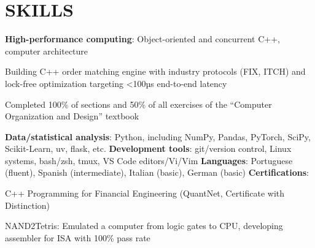 \section{SKILLS}
\textbf{High-performance computing}: Object-oriented and concurrent C++, computer architecture
\begin{onecolentry}
    \begin{highlights}
        \item Building C++ order matching engine with industry protocols (FIX, ITCH) and lock-free optimization targeting <100µs end-to-end latency
        \item Completed 100\% of sections and 50\% of all exercises of the “Computer Organization and Design” textbook 
    \end{highlights}
\end{onecolentry}
\textbf{Data/statistical analysis}: Python, including NumPy, Pandas, PyTorch, SciPy, Scikit-Learn, uv, flask, etc. \newline
\textbf{Development tools}: git/version control, Linux systems, bash/zsh, tmux, VS Code editors/Vi/Vim \newline
\textbf{Languages}: Portuguese (fluent), Spanish (intermediate), Italian (basic), German (basic) \newline
\textbf{Certifications}:
\begin{onecolentry}
    \begin{highlights}
        \item C++ Programming for Financial Engineering (QuantNet, Certificate with Distinction)
        \item NAND2Tetris: Emulated a computer from logic gates to CPU, developing assembler for ISA with 100\% pass rate
    \end{highlights}
\end{onecolentry}
